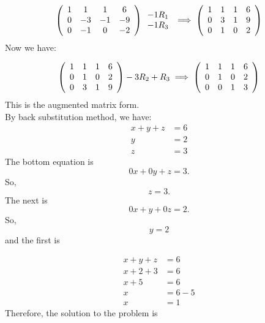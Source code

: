\documentclass[a4paper, 12pt]{report}
\begin{document}
{     \[
     \left( \begin{array}{c c c c}
     1& 1& 1& 6\\
     0& -3& -1& -9\\
     0& -1& 0& -2
     \end{array} \right)
     \begin{array}{c}-1R_1 \\ -1R_3 \end{array}
     \implies
     \left( \begin{array}{c c c c}
     1& 1& 1& 6\\
     0& 3& 1& 9\\
     0& 1& 0& 2
     \end{array} \right)
     \]
     Now we have:
     
     \[
     \left( \begin{array}{c c c c}
     1& 1& 1& 6\\
     0& 1& 0& 2\\
     0& 3& 1& 9
     \end{array} \right)
     -3R_2 + R_3
     \implies
     \left( \begin{array}{c c c c}
     1& 1& 1& 6\\
     0& 1& 0& 2\\
     0& 0& 1& 3
     \end{array} \right)
     \]
     This is the augmented matrix form.\\
     
     By back substitution method, we have:  
     \begin{align*}
     x+y+z&=6\\
     y&=2\\
     z&=3
     \end{align*}
     The bottom equation is
     \begin{equation*}
      0x+0y+z=3.
      \end{equation*}
       So,
       \begin{equation*}
        z=3.
        \end{equation*}
     The next is
     \begin{equation*}
      0x+y+0z=2.
      \end{equation*}
      So, 
      \begin{equation*}
      y=2
     \end{equation*}
     and the first is
     
     \begin{align*}
     x+y+z&=6\\
     x+2+3&=6\\
     x+5&=6\\
     x&=6-5\\
     x&=1
     \end{align*}
     Therefore, the solution to the problem is
     
}
\end{document}
